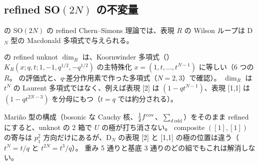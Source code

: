 \subsection{refined SO$(2N)$ の不変量}
\cite{AgSc12} の SO$(2N)$ の refined Chern--Simons 理論では、表現 $R$ の Wilson ループは D$_N$ 型の Macdonald 多項式で与えられる。
\begin{compresult}
\cite{AgSc12} の refined unknot $\dim_R$ は、Koornwinder 多項式（\cite{Koornwinder92}）$K_R(x; q, t; 1, -1, q^{1/2}, -q^{1/2})$ の主特殊化 $x = (1, t, \dots, t^{N-1})$ に等しい（6 つの $R$。\cite{vD96,Sahi99} の評価式と、$q$-差分作用素で作った多項式（$N = 2, 3$）で確認）。
$\dim_R$ は $t^N$ の Laurent 多項式ではなく、例えば表現 [2] は $(1 - q t^{N-1})$、表現 [1,1] は $(1 - q t^{2N-3})$ を分母にもつ（$t = q$ では約分される）。
\end{compresult}

\begin{remark}
Mariño 型の構成（bosonic な Cauchy 核、$\tfrac12 f^{\mathrm{cov}}$、$\sum_{d\ \mathrm{odd}}$）をそのまま refined にすると、unknot の 2 箱で $U$ の極が打ち消さない。
composite $([1],[1])$ の寄与は $p_1^2$ 方向だけにあるが、D$_N$ の表現 [2] と [1,1] の極の位置は違う（$t^N = t/q$ と $t^{2N} = t^3/q$）。
重み 5 通りと基底 3 通りのどの組でもこれは解消しない。
\end{remark}

